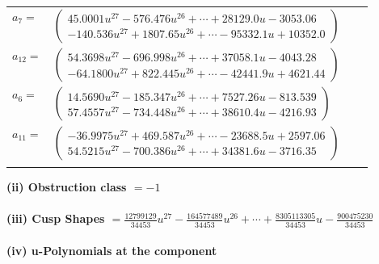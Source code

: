 \documentclass[1p]{elsarticle_modified}
\theoremstyle{definition}
\begin{document}
\begin{tabular}{m{7pt} m{180pt} m{7pt} m{180pt} }
\flushright $a_{7}=$&$\begin{pmatrix}45.0001 u^{27}-576.476 u^{26}+\cdots+28129.0 u-3053.06\\-140.536 u^{27}+1807.65 u^{26}+\cdots-95332.1 u+10352.0\end{pmatrix}$ \\
\flushright $a_{12}=$&$\begin{pmatrix}54.3698 u^{27}-696.998 u^{26}+\cdots+37058.1 u-4043.28\\-64.1800 u^{27}+822.445 u^{26}+\cdots-42441.9 u+4621.44\end{pmatrix}$ \\
\flushright $a_{6}=$&$\begin{pmatrix}14.5690 u^{27}-185.347 u^{26}+\cdots+7527.26 u-813.539\\57.4557 u^{27}-734.448 u^{26}+\cdots+38610.4 u-4216.93\end{pmatrix}$ \\
\flushright $a_{11}=$&$\begin{pmatrix}-36.9975 u^{27}+469.587 u^{26}+\cdots-23688.5 u+2597.06\\54.5215 u^{27}-700.386 u^{26}+\cdots+34381.6 u-3716.35\end{pmatrix}$\\&\end{tabular}
\flushleft \textbf{(ii) Obstruction class $= -1$}\\~\\
\flushleft \textbf{(iii) Cusp Shapes $= \frac{12799129}{34453} u^{27}-\frac{164577489}{34453} u^{26}+\cdots+\frac{8305113305}{34453} u-\frac{900475230}{34453}$}\\~\\
\newpage\renewcommand{\arraystretch}{1}
\flushleft \textbf{(iv) u-Polynomials at the component}\newline \\
\end{document}
